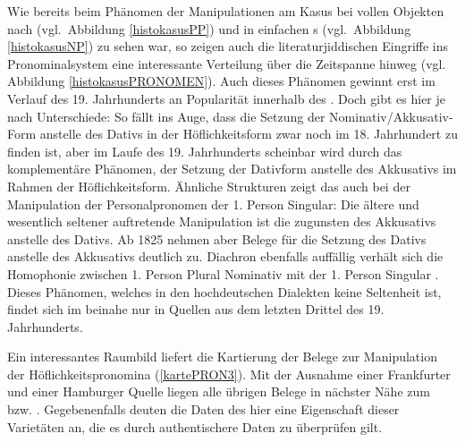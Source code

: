 Wie bereits beim Phänomen der Manipulationen am Kasus bei vollen Objekten nach  (vgl.\, Abbildung \ref{histokasusPP}) und in einfachen \hai{{\NP}}s (vgl.\, Abbildung \ref{histokasusNP}) zu sehen war, so zeigen auch die literaturjiddischen Eingriffe ins Pronominalsystem eine interessante Verteilung über die Zeitspanne hinweg (vgl.\, Abbildung \ref{histokasusPRONOMEN}). Auch dieses Phänomen gewinnt erst im Verlauf des 19. Jahrhunderts an Popularität innerhalb des .  Doch gibt es hier je nach  Unterschiede: So fällt ins Auge, dass die Setzung der Nominativ/Akkusativ-Form anstelle des Dativs in der Höflichkeitsform zwar noch im 18. Jahrhundert zu finden ist, aber im Laufe des 19. Jahrhunderts scheinbar  wird durch das komplementäre Phänomen, der Setzung der Dativform anstelle des Akkusativs im Rahmen der Höflichkeitsform. Ähnliche Strukturen zeigt das  auch bei der Manipulation der Personalpronomen der 1. Person Singular: Die ältere und wesentlich seltener auftretende Manipulation ist die zugunsten des Akkusativs anstelle des Dativs. Ab 1825 nehmen aber Belege für die Setzung des Dativs anstelle des Akkusativs deutlich zu. Diachron ebenfalls auffällig verhält sich die Homophonie zwischen 1. Person Plural Nominativ mit der 1. Person Singular . Dieses Phänomen, welches in den hochdeutschen Dialekten keine Seltenheit ist, findet sich im  beinahe nur in Quellen aus dem letzten Drittel des 19. Jahrhunderts. 
	

		
Ein interessantes Raumbild liefert die Kartierung der Belege zur Manipulation der Höflichkeitspronomina (\ref{kartePRON3}). Mit der Ausnahme einer Frankfurter und einer Hamburger Quelle liegen alle übrigen Belege in nächster Nähe zum  bzw. . Gegebenenfalls deuten die Daten des  hier eine Eigenschaft dieser Varietäten an, die es durch authentischere Daten zu überprüfen gilt.
	
